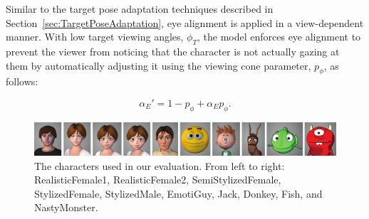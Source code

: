 Similar to the target pose adaptation techniques described in Section~\ref{sec:TargetPoseAdaptation}, eye alignment is applied in a view-dependent manner. With low target viewing angles, $\phi_T$, the model enforces eye alignment to prevent the viewer from noticing that the character is not actually gazing at them by automatically adjusting it using the viewing cone parameter, $p_{\phi}$, as follows:

\begin{equation}
\alpha_E' = 1 - p_{\phi} + \alpha_E p_{\phi}.
\end{equation}

\begin{figure}[t]
\centering
\includegraphics[width=1\textwidth]{Figures/TestCases-small.pdf}
\caption{The characters used in our evaluation. From left to right: RealisticFemale1, RealisticFemale2, SemiStylizedFemale, StylizedFemale, StylizedMale, EmotiGuy, Jack, Donkey, Fish, and NastyMonster.}
\vspace{-10pt}
\label{fig:TestCases}
\end{figure}